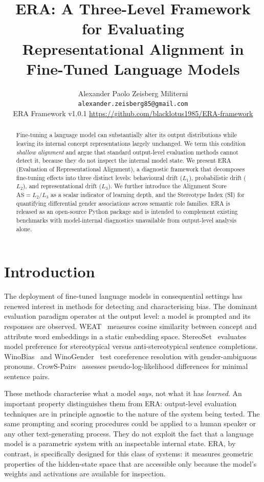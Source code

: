 \documentclass[11pt,a4paper]{article}
\title{\textbf{ERA: A Three-Level Framework for Evaluating\\
Representational Alignment in Fine-Tuned Language Models}}
\author{Alexander Paolo Zeisberg Militerni\\
\small\texttt{alexander.zeisberg85@gmail.com}\\
\small ERA Framework v1.0.1 \quad
\url{https://github.com/blacklotus1985/ERA-framework}}
\date{}
\begin{document}
\maketitle

\begin{abstract}
Fine-tuning a language model can substantially alter its output distributions while leaving
its internal concept representations largely unchanged. We term this condition
\emph{shallow alignment} and argue that standard output-level evaluation methods cannot
detect it, because they do not inspect the internal model state.
We present ERA (Evaluation of Representational Alignment), a diagnostic framework that
decomposes fine-tuning effects into three distinct levels: behavioural drift ($L_1$),
probabilistic drift ($L_2$), and representational drift ($L_3$). We further introduce the
Alignment Score $\mathrm{AS} = L_2 / L_3$ as a scalar indicator of learning depth, and the
Stereotype Index (SI) for quantifying differential gender associations across semantic role
families. ERA is released as an open-source Python package and is intended to complement
existing benchmarks with model-internal diagnostics unavailable from output-level analysis alone.
\end{abstract}

\section{Introduction}

The deployment of fine-tuned language models in consequential settings has renewed
interest in methods for detecting and characterising bias. The dominant evaluation
paradigm operates at the output level: a model is prompted and its responses are
observed. WEAT~\citep{caliskan2017} measures cosine similarity between concept and
attribute word embeddings in a static embedding space. StereoSet~\citep{nadeem2021}
evaluates model preference for stereotypical versus anti-stereotypical sentence completions.
WinoBias~\citep{zhao2018} and WinoGender~\citep{rudinger2018} test coreference resolution
with gender-ambiguous pronouns. CrowS-Pairs~\citep{nangia2021} assesses pseudo-log-likelihood
differences for minimal sentence pairs.

These methods characterise what a model \emph{says}, not what it has \emph{learned}.
An important property distinguishes them from ERA: output-level evaluation techniques are
in principle agnostic to the nature of the system being tested. The same prompting and scoring
procedures could be applied to a human speaker or any other text-generating process. They do
not exploit the fact that a language model is a parametric system with an inspectable internal
state. ERA, by contrast, is specifically designed for this class of systems: it measures
geometric properties of the hidden-state space that are accessible only because the model's
weights and activations are available for inspection.
\end{document}
